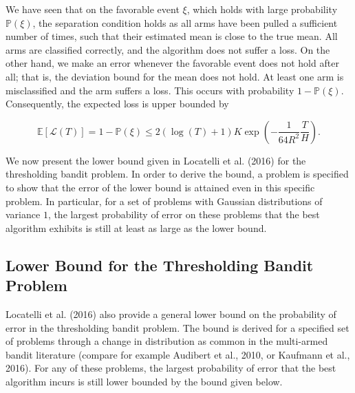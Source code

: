 \documentclass[11pt,]{article}
\begin{document}
We have seen that on the favorable event \(\xi\), which holds with large
probability \(\mathbb{P}(\xi)\), the separation condition holds as all
arms have been pulled a sufficient number of times, such that their
estimated mean is close to the true mean. All arms are classified
correctly, and the algorithm does not suffer a loss. On the other hand,
we make an error whenever the favorable event does not hold after all;
that is, the deviation bound for the mean does not hold. At least one
arm is misclassified and the arm suffers a loss. This occurs with
probability \(1-\mathbb{P}(\xi)\). Consequently, the expected loss is
upper bounded by

\[
\mathbb{E}[\mathcal{L}(T)] = 1 - \mathbb{P}(\xi) \leq 2(\log(T)+1)K \exp(-\frac{1}{64R^2}\frac{T}{H}).
\]

We now present the lower bound given in Locatelli et al. (2016) for the
thresholding bandit problem. In order to derive the bound, a problem is
specified to show that the error of the lower bound is attained even in
this specific problem. In particular, for a set of problems with
Gaussian distributions of variance \(1\), the largest probability of
error on these problems that the best algorithm exhibits is still at
least as large as the lower bound.

\subsection{\texorpdfstring{Lower Bound for the Thresholding Bandit
Problem
\label{sec:LowerBoundLocatelli}}{Lower Bound for the Thresholding Bandit Problem }}\label{lower-bound-for-the-thresholding-bandit-problem}

Locatelli et al. (2016) also provide a general lower bound on the
probability of error in the thresholding bandit problem. The bound is
derived for a specified set of problems through a change in distribution
as common in the multi-armed bandit literature (compare for example
Audibert et al., 2010, or Kaufmann et al., 2016). For any of these
problems, the largest probability of error that the best algorithm
incurs is still lower bounded by the bound given below.
\end{document}
